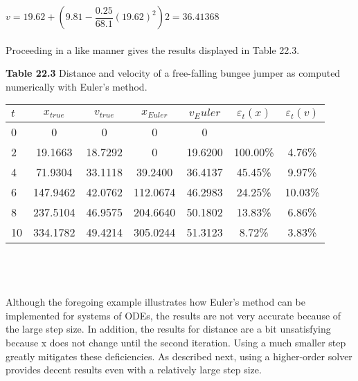 $v = 19.62 + \left( 9.81 − \dfrac{0.25}{68.1} (19.62)^2 \right)2 = 36.41368$\\
\\
Proceeding in a like manner gives the results displayed in Table 22.3.

\textbf{Table 22.3} Distance and velocity of a free-falling bungee jumper as computed
numerically with Euler’s method.\\

\begin{tabular}{lcccccc}
\hline

	\textbf{$t$} \; \; \; \; \; & \textbf{$x_{true}$} \; \; \; \; \; & \textbf{$v_{true}$} \; \; \; \; \; & \textbf{$x_{Euler}$} \; \; \; \; \; & \textbf{$v_Euler$} \; \; \; \; \; & \textbf{$\varepsilon_{t}(x)$} \; \; \; \; \; & \textbf{$\varepsilon_{t}(v)$}\\
	
\hline

	0 & 0 & 0 & 0 & 0 & \vspace{} & \vspace{}\\
	
	2 & 19.1663 & 18.7292 & 0 & 19.6200 & 100.00\% & 4.76\%\\
	
	4 & 71.9304 & 33.1118 & 39.2400 & 36.4137 & 45.45\% & 9.97\%\\
	
	6 & 147.9462 & 42.0762 & 112.0674 & 46.2983 & 24.25\% & 10.03\%\\
	
	8 & 237.5104 & 46.9575 & 204.6640 & 50.1802 & 13.83\% & 6.86\%\\
	
	10 & 334.1782 & 49.4214 & 305.0244 & 51.3123 & 8.72\% & 3.83\%\\

\hline
\end{tabular}\\
\\
\\
\hline
\vspace{0.2in}
Although the foregoing example illustrates how Euler’s method can be implemented for
systems of ODEs, the results are not very accurate because of the large step size. In addition,
the results for distance are a bit unsatisfying because x does not change until the second
iteration. Using a much smaller step greatly mitigates these deficiencies. As described next,
using a higher-order solver provides decent results even with a relatively large step size.

